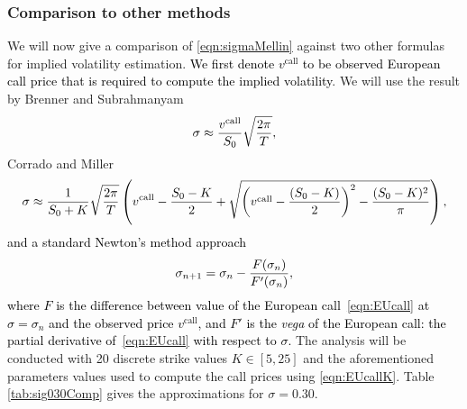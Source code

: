 \subsubsection{Comparison to other methods}
We will now give a comparison of \eqref{eqn:sigmaMellin} against two other formulas for implied volatility estimation. \textcolor{black}{We first denote $v^\text{call}$ to be observed European call price that is required to compute the implied volatility}. We will use the result by Brenner and Subrahmanyam~\cite{Brenner1988}
	\begin{equation}
		\label{eqn:brensub}
		\sigma \approx \frac{v^\text{call}}{S_0}\sqrt{\frac{2\pi}{T}},
	\end{equation}
Corrado and Miller~\cite{Corrado1996}
	\begin{equation}
		\label{eqn:corrado}
		\sigma \approx \frac{1}{S_0 + K}\sqrt{\frac{2\pi}{T}}\left( v^\text{call} - \frac{S_0 - K}{2} + \sqrt{\left( v^\text{call} - \frac{(S_0 - K)}{2} \right)^2 - \frac{(S_0-K)^2}{\pi} } \right),
	\end{equation}
\textcolor{black}{and a standard Newton's method approach~\cite{Higham2004}
    \begin{equation}
        \label{eqn:newton}
        \sigma_{n+1} = \sigma_n - \frac{F(\sigma_n)}{F'(\sigma_n)},
    \end{equation}
where $F$ is the difference between value of the European call~\eqref{eqn:EUcall} at $\sigma = \sigma_n$ and the observed price $v^\text{call}$, and $F'$ is the \emph{vega} of the European call: the partial derivative of~\eqref{eqn:EUcall} with respect to $\sigma$.
}
The analysis will be conducted with 20 discrete strike values $K \in [5,25]$ and the aforementioned parameters values used to compute the call prices using \eqref{eqn:EUcallK}. Table \ref{tab:sig030Comp} gives the approximations for $\sigma = 0.30$.

